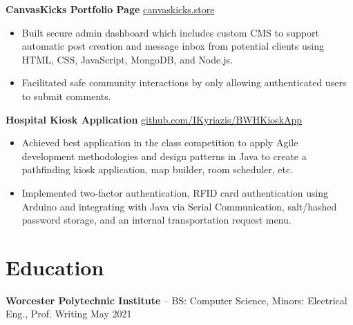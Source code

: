 \documentclass[11pt]{article}       %
\begin{document}
\textbf{CanvasKicks Portfolio Page} \hfill \href{https://canvaskicks.store}{canvaskicks.store} \\
\vspace{-9pt}
\begin{itemize}
  \item Built secure admin dashboard which includes custom CMS to support automatic post creation and message inbox from potential clients using HTML, CSS, JavaScript, MongoDB, and Node.js.
  \item Facilitated safe community interactions by only allowing authenticated users to submit comments.
\end{itemize}

\textbf{Hospital Kiosk Application} \hfill \href{https://github.com/IKyriazis/BWHKioskApp/commits?author=IKyriazis}{github.com/IKyriazis/BWHKioskApp} \\
\vspace{-9pt}
\begin{itemize}
  \item Achieved best application in the class competition to apply Agile development methodologies and design patterns in Java to create a pathfinding kiosk application, map builder, room scheduler, etc.
  \item Implemented two‐factor authentication, RFID card authentication using Arduino and integrating with Java via Serial Communication, salt/hashed password storage, and an internal transportation request menu.
\end{itemize}


\vspace{-18.5pt}

\section*{Education}
\textbf{Worcester Polytechnic Institute} -- BS: Computer Science, Minors: Electrical Eng., Prof. Writing \hfill May 2021
\end{document}

